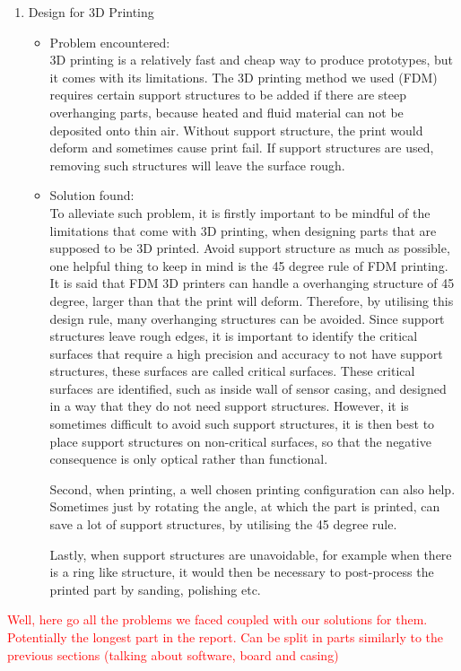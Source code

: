 \begin{enumerate}
\begin{itemize}
  \end{itemize}
  \item Design for 3D Printing
  \begin{itemize}
      \item Problem encountered:\\
      3D printing is a relatively fast and cheap way to produce prototypes, but it comes with its limitations. The 3D printing method we used (FDM) requires certain support structures to be added if there are steep overhanging parts, because heated and fluid material can not be deposited onto thin air. Without support structure, the print would deform and sometimes cause print fail. If support structures are used, removing such structures will leave the surface rough.
      \item Solution found:\\
      To alleviate such problem, it is firstly important to be mindful of the limitations that come with 3D printing, when designing parts that are supposed to be 3D printed. Avoid support structure as much as possible, one helpful thing to keep in mind is the 45 degree rule of FDM printing. It is said that FDM 3D printers can handle a overhanging structure of 45 degree, larger than that the print will deform. Therefore, by utilising this design rule, many overhanging structures can be avoided. Since support structures leave rough edges, it is important to identify the critical surfaces that require a high precision and accuracy to not have support structures, these surfaces are called critical surfaces. These critical surfaces are identified, such as inside wall of sensor casing, and designed in a way that they do not need support structures. However, it is sometimes difficult to avoid such support structures, it is then best to place support structures on non-critical surfaces, so that the negative consequence is only optical rather than functional.
      
      Second, when printing, a well chosen printing configuration can also help. Sometimes just by rotating the angle, at which the part is printed, can save a lot of support structures, by utilising the 45 degree rule.
      
      Lastly, when support structures are unavoidable, for example when there is a ring like structure, it would then be necessary to post-process the printed part by sanding, polishing etc.
  \end{itemize}
\end{enumerate}

\textcolor{red}{
Well, here go all the problems we faced coupled with our solutions for them. Potentially the longest part in the report. Can be split in parts similarly to the previous sections (talking about software, board and casing)
}
